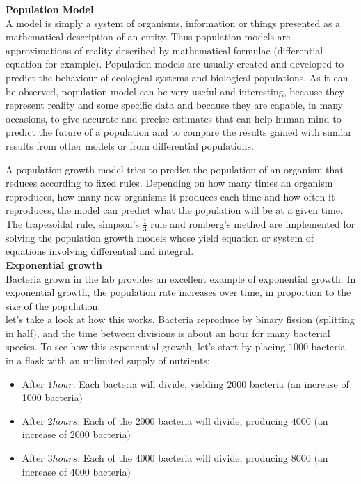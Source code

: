 \documentclass[a4paper,12pt]{report}
\numberwithin{equation}{section}
\begin{document}
\textbf{Population Model}\\
\indent A model is simply a system of organisms, information or things presented as a mathematical description of an entity. Thus population models are approximations of reality described by mathematical formulae $($differential equation for example$)$. Population models are usually created and developed to predict the behaviour of ecological systems and biological populations. As it can be observed, population model can be very useful and interesting, because they represent reality and some specific data and because they are capable, in many occasions, to give accurate and precise estimates that can help human mind to predict the future of a population and to compare the results gained with similar results from other models or from differential populations.


\indent A population growth model tries to predict the population of an organism that reduces according to fixed rules. Depending on how many times an organism reproduces, how many new organisms it produces each time and how often it reproduces, the model can predict what the population will be at a given time.\\
\indent The trapezoidal rule, simpson's $\frac{1}{3}$ rule and romberg's method are implemented for solving the population growth models whose yield equation or system of equations involving differential and integral.\\


\textbf{Exponential growth}\\
\indent Bacteria grown in the lab provides an excellent example of exponential growth. In exponential growth, the population rate increases over time, in proportion to the size of the population.\\
\indent let's take a look at how this works. Bacteria reproduce by binary fission $($splitting in half$)$, and the time between divisions is about an hour for many bacterial species. To see how this exponential growth, let's start by placing $1000$ bacteria in a flask with an unlimited supply of nutrients:
\begin{itemize}
\item After $1hour$: Each bacteria will divide, yielding $2000$ bacteria $($an increase of 1000 bacteria$)$ 
\item After $2hours$: Each of the $2000$ bacteria will divide, producing $4000$ $($an increase of 2000 bacteria$)$   
\item After $3hours$: Each of the $4000$ bacteria will divide, producing $8000$ $($an increase of 4000 bacteria$)$ 
\end{itemize}
\end{document}
